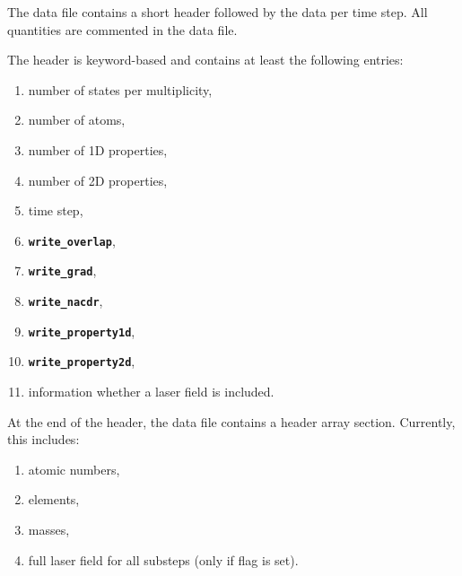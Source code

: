 \documentclass[a4paper,10pt,DIV=15,openany,twoside=false]{scrbook}
\newcommand{\ttt}[1]{\textbf{\texttt{#1}}}
\begin{document}
The data file contains a short header followed by the data per time step. All quantities are commented in the data file.

The header is keyword-based and contains at least the following entries:
\begin{enumerate}
  \item number of states per multiplicity,
  \item number of atoms,
  \item number of 1D properties,
  \item number of 2D properties,
  \item time step,
  \item \ttt{write\_overlap},
  \item \ttt{write\_grad},
  \item \ttt{write\_nacdr},
  \item \ttt{write\_property1d},
  \item \ttt{write\_property2d},
  \item information whether a laser field is included.
\end{enumerate}

At the end of the header, the data file contains a header array section. Currently, this includes:
\begin{enumerate}
  \item atomic numbers,
  \item elements,
  \item masses,
  \item full laser field for all substeps (only if flag is set).
\end{enumerate}
\end{document}
